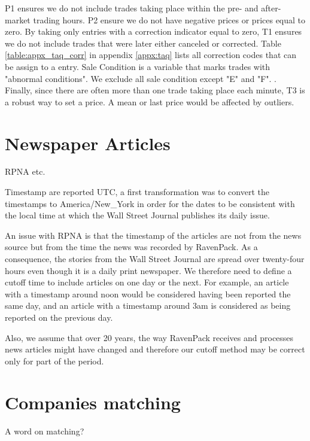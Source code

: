 P1 ensures we do not include trades taking place within the pre- and after-market trading hours. P2 ensure we do not have negative prices or prices equal to zero. By taking only entries with a correction indicator equal to zero, T1 ensures we do not include trades that were later either canceled or corrected. Table \ref{table:appx_taq_corr} in appendix \ref{appx:taq} lists all correction codes that can be assign to a entry. Sale Condition is a variable that marks trades with "abnormal conditions". We exclude all sale condition except "E" and "F". . Finally, since there are often more than one trade taking place each minute, T3 is a robust way to set a price. A mean or last price would be affected by outliers.








\section{Newspaper Articles}
RPNA etc.

Timestamp are reported UTC, a first transformation was to convert the timestamps to America/New\_York in order for the dates to be consistent with the local time at which the Wall Street Journal publishes its daily issue.

An issue with RPNA is that the timestamp of the articles are not from the news source but from the time the news was recorded by RavenPack. As a consequence, the stories from the Wall Street Journal are spread over twenty-four hours even though it is a daily print newspaper. We therefore need to define a cutoff time to include articles on one day or the next. For example, an article with a timestamp around noon would be considered having been reported the same day, and an article with a timestamp around 3am is considered as being reported on the previous day.

Also, we assume that over 20 years, the way RavenPack receives and processes news articles might have changed and therefore our cutoff method may be correct only for part of the period.


\section{Companies matching}
A word on matching?